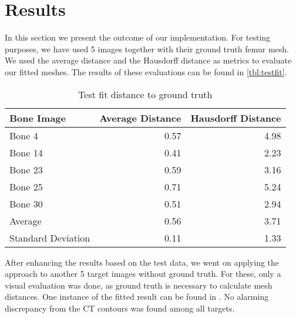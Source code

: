 \section{Results}
\label{sec:results}

In this section we present the outcome of our implementation.
For testing purposes, we have used 5 images together with their ground truth femur mesh.
We used the average distance and the Hausdorff distance as metrics to evaluate our fitted meshes.
The results of these evaluations can be found in \autoref{tbl:testfit}.

\begin{table}
  \centering
  \caption{Test fit distance to ground truth}
  \label{tbl:testfit}
  \begin{tabular}{lrr}
    \toprule
      \textbf{Bone Image} &
      Average Distance &
       Hausdorff Distance \\
    \midrule
      Bone 4 & 0.57 & 4.98 \\
      Bone 14 & 0.41 & 2.23 \\
      Bone 23 & 0.59 & 3.16 \\
      Bone 25 & 0.71 & 5.24 \\
      Bone 30 & 0.51 & 2.94 \\
    \midrule
      Average & 0.56 & 3.71 \\
      Standard Deviation & 0.11 & 1.33 \\
    \bottomrule
  \end{tabular}
\end{table}

After enhancing the results based on the test data, we went on applying the approach to another 5 target images without ground truth.
For these, only a visual evaluation was done, as ground truth is necessary to calculate mesh distances.
One instance of the fitted result can be found in .
No alarming discrepancy from the CT contours was found among all targets.
